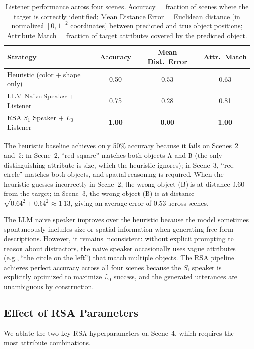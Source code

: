\documentclass[10pt]{article}
\begin{document}
\begin{table}[H]
\centering
\begin{tabular}{lccc}
\toprule
Strategy & Accuracy & Mean Dist.\ Error & Attr.\ Match \\
\midrule
Heuristic (color + shape only) & 0.50 & 0.53 & 0.63 \\
LLM Naive Speaker + Listener   & 0.75 & 0.28 & 0.81 \\
RSA $S_1$ Speaker + $L_0$ Listener & \textbf{1.00} & \textbf{0.00} & \textbf{1.00} \\
\bottomrule
\end{tabular}
\caption{Listener performance across four scenes. Accuracy = fraction of scenes where the target is correctly identified; Mean Distance Error = Euclidean distance (in normalized $[0,1]^2$ coordinates) between predicted and true object positions; Attribute Match = fraction of target attributes covered by the predicted object.}
\label{tab:results}
\end{table}
\vspace{-3mm}
The heuristic baseline achieves only 50\% accuracy because it fails on Scenes~2 and~3: in Scene~2, ``red square'' matches both objects A and B (the only distinguishing attribute is size, which the heuristic ignores); in Scene~3, ``red circle'' matches both objects, and spatial reasoning is required. When the heuristic guesses incorrectly in Scene~2, the wrong object (B) is at distance 0.60 from the target; in Scene~3, the wrong object (B) is at distance $\sqrt{0.64^2 + 0.64^2} \approx 1.13$, giving an average error of 0.53 across scenes.

The LLM naive speaker improves over the heuristic because the model sometimes spontaneously includes size or spatial information when generating free-form descriptions. However, it remains inconsistent: without explicit prompting to reason about distractors, the naive speaker occasionally uses vague attributes (e.g., ``the circle on the left'') that match multiple objects. The RSA pipeline achieves perfect accuracy across all four scenes because the $S_1$ speaker is explicitly optimized to maximize $L_0$ success, and the generated utterances are unambiguous by construction.

\subsection{Effect of RSA Parameters}
\label{sec:ablation}

We ablate the two key RSA hyperparameters on Scene~4, which requires the most attribute combinations.
\end{document}
